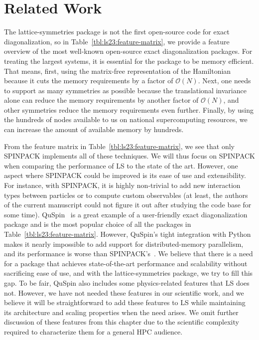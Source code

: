\section{Related Work}\label{sec:ls23:related-work}

The lattice-symmetries package is not the first open-source code for exact diagonalization, so in Table~\ref{tbl:ls23:feature-matrix}, we provide a feature overview of the most well-known open-source exact diagonalization packages. For treating the largest systems, it is essential for the package to be memory efficient. That means, first, using the matrix-free representation of the Hamiltonian because it cuts the memory requirements by a factor of $\mathcal{O}(N)$. Next, one needs to support as many symmetries as possible because the translational invariance alone can reduce the memory requirements by another factor of $\mathcal{O}(N)$, and other symmetries reduce the memory requirements even further. Finally, by using the hundreds of nodes available to us on national supercomputing resources, we can increase the amount of available memory by hundreds.

From the feature matrix in Table~\ref{tbl:ls23:feature-matrix}, we see that only SPINPACK implements all of these techniques. We will thus focus on SPINPACK when comparing the performance of LS to the state of the art. However, one aspect where SPINPACK could be improved is its ease of use and extensibility. For instance, with SPINPACK, it is highly non-trivial to add new interaction types between particles or to compute custom observables (at least, the authors of the current manuscript could not figure it out after studying the code base for some time). QuSpin~\cite{Weinbe2017QuspinAPytho,Weinbe2019QuspinAPytho} is a great example of a user-friendly exact diagonalization package and is the most popular choice of all the packages in Table~\ref{tbl:ls23:feature-matrix}. However, QuSpin's tight integration with Python makes it nearly impossible to add support for distributed-memory parallelism, and its performance is worse than SPINPACK's~\cite{Westerhout2021latti}. We believe that there is a need for a package that achieves state-of-the-art performance and scalability without sacrificing ease of use, and with the lattice-symmetries package, we try to fill this gap. To be fair, QuSpin also includes some physics-related features that LS does not. However, we have not needed these features in our scientific work, and we believe it will be straightforward to add these features to LS while maintaining its architecture and scaling properties when the need arises. We omit further discussion of these features from this chapter due to the scientific complexity required to characterize them for a general HPC audience.


